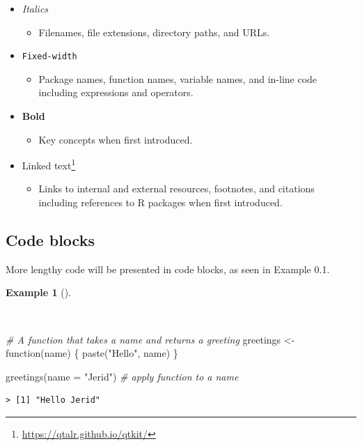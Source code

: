 \documentclass[
  letterpaper,
]{latex/krantz}
\newenvironment{Shaded}{\begin{snugshade}}{\end{snugshade}}
\newcommand{\AttributeTok}[1]{\textcolor[rgb]{0.00,0.00,0.00}{#1}}
\newcommand{\CommentTok}[1]{\textcolor[rgb]{0.00,0.00,0.00}{\textit{#1}}}
\newcommand{\ControlFlowTok}[1]{\textcolor[rgb]{0.00,0.00,0.00}{#1}}
\newcommand{\FunctionTok}[1]{\textcolor[rgb]{0.00,0.00,0.00}{#1}}
\newcommand{\NormalTok}[1]{\textcolor[rgb]{0.00,0.00,0.00}{#1}}
\newcommand{\OtherTok}[1]{\textcolor[rgb]{0.00,0.00,0.00}{#1}}
\newcommand{\StringTok}[1]{\textcolor[rgb]{0.00,0.00,0.00}{#1}}
\providecommand{\tightlist}{%
  \setlength{\itemsep}{0pt}\setlength{\parskip}{0pt}}\usepackage{longtable,booktabs,array}
\theoremstyle{definition}
\newtheorem{example}{Example}[chapter]
\theoremstyle{remark}
\DeclareRobustCommand{\href}[2]{#2\footnote{\url{#1}}}
\begin{document}
\begin{itemize}
\tightlist
\item
  \emph{Italics}

  \begin{itemize}
  \tightlist
  \item
    Filenames, file extensions, directory paths, and URLs.
  \end{itemize}
\item
  \texttt{Fixed-width}

  \begin{itemize}
  \tightlist
  \item
    Package names, function names, variable names, and in-line code
    including expressions and operators.
  \end{itemize}
\item
  \textbf{Bold}

  \begin{itemize}
  \tightlist
  \item
    Key concepts when first introduced.
  \end{itemize}
\item
  \href{https://qtalr.github.io/qtkit/}{Linked text}

  \begin{itemize}
  \tightlist
  \item
    Links to internal and external resources, footnotes, and citations
    including references to R packages when first introduced.
  \end{itemize}
\end{itemize}

\subsection*{Code blocks}\label{sec-p-code-blocks}

More lengthy code will be presented in code blocks, as seen in Example
0.1.

\begin{example}[]\protect\hypertarget{exm-code-block}{}\label{exm-code-block}

~

\begin{Shaded}
\begin{Highlighting}[]
\CommentTok{\# A function that takes a name and returns a greeting}
\NormalTok{greetings }\OtherTok{\textless{}{-}} \ControlFlowTok{function}\NormalTok{(name) \{}
  \FunctionTok{paste}\NormalTok{(}\StringTok{"Hello"}\NormalTok{, name)}
\NormalTok{\}}

\FunctionTok{greetings}\NormalTok{(}\AttributeTok{name =} \StringTok{"Jerid"}\NormalTok{) }\CommentTok{\# apply function to a name}
\end{Highlighting}
\end{Shaded}

\begin{verbatim}
> [1] "Hello Jerid"
\end{verbatim}

\end{example}
\end{document}
